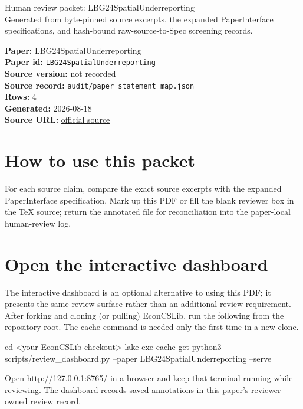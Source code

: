 \documentclass[10pt]{article}
\begin{document}
\fontsize{9}{10}\selectfont

\begin{center}
{\LARGE Human review packet: LBG24SpatialUnderreporting}\\[0.35em]
\small Generated from byte-pinned source excerpts, the expanded PaperInterface
specifications, and hash-bound raw-source-to-Spec screening records.
\end{center}

\noindent\textbf{Paper:} LBG24SpatialUnderreporting\\
\textbf{Paper id:} \texttt{LBG24SpatialUnderreporting}\\
\textbf{Source version:} not recorded\\
\textbf{Source record:} \texttt{audit/paper\_statement\_map.json}\\
\textbf{Rows:} 4\\
\textbf{Generated:} 2026-08-18\\
\textbf{Source URL:} \href{https://arxiv.org/pdf/2204.08620}{official source}

\noindent{}\par



\section*{How to use this packet}
For each source claim, compare the exact source excerpts with the expanded
PaperInterface specification. Mark up this PDF or fill the blank reviewer box in the TeX source;
return the annotated file for reconciliation into the paper-local human-review
log.

\section*{Open the interactive dashboard}
The interactive dashboard is an optional alternative to using this PDF; it
presents the same review surface rather than an additional review requirement.
After forking and cloning (or pulling) EconCSLib, run the following from the
repository root. The cache command is needed only the first time in a new clone.
\begin{ReviewVerbatim}
cd <your-EconCSLib-checkout>
lake exe cache get
python3 scripts/review_dashboard.py --paper LBG24SpatialUnderreporting --serve
\end{ReviewVerbatim}
Open \url{http://127.0.0.1:8765/} in a browser and keep that terminal running
while reviewing. The dashboard records saved annotations in this paper's
reviewer-owned review record.
\end{document}
